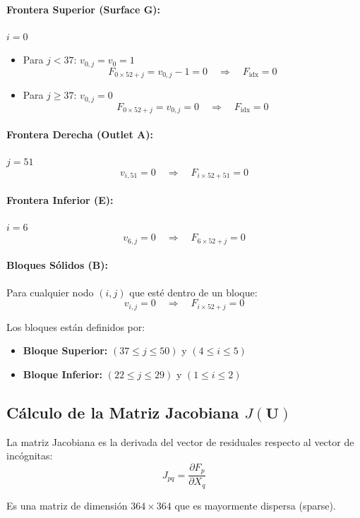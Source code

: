 \documentclass[11pt,letterpaper]{article}
\begin{document}
\paragraph{Frontera Superior (Surface G):} $i = 0$
\begin{itemize}
    \item Para $j < 37$: $v_{0,j} = v_0 = 1$
    \[
    F_{0 \times 52 + j} = v_{0,j} - 1 = 0 \quad \Rightarrow \quad F_{\text{idx}} = 0
    \]
    \item Para $j \geq 37$: $v_{0,j} = 0$
    \[
    F_{0 \times 52 + j} = v_{0,j} = 0 \quad \Rightarrow \quad F_{\text{idx}} = 0
    \]
\end{itemize}

\paragraph{Frontera Derecha (Outlet A):} $j = 51$
\[
v_{i,51} = 0 \quad \Rightarrow \quad F_{i \times 52 + 51} = 0
\]

\paragraph{Frontera Inferior (E):} $i = 6$
\[
v_{6,j} = 0 \quad \Rightarrow \quad F_{6 \times 52 + j} = 0
\]

\paragraph{Bloques Sólidos (B):}
Para cualquier nodo $(i,j)$ que esté dentro de un bloque:
\[
v_{i,j} = 0 \quad \Rightarrow \quad F_{i \times 52 + j} = 0
\]

Los bloques están definidos por:
\begin{itemize}
    \item \textbf{Bloque Superior:} $(37 \leq j \leq 50)$ y $(4 \leq i \leq 5)$
    \item \textbf{Bloque Inferior:} $(22 \leq j \leq 29)$ y $(1 \leq i \leq 2)$
\end{itemize}

\subsection{Cálculo de la Matriz Jacobiana $J(\mathbf{U})$}

La matriz Jacobiana es la derivada del vector de residuales respecto al vector de incógnitas:
\[
J_{pq} = \frac{\partial F_p}{\partial X_q}
\]

Es una matriz de dimensión $364 \times 364$ que es mayormente dispersa (sparse).
\end{document}
